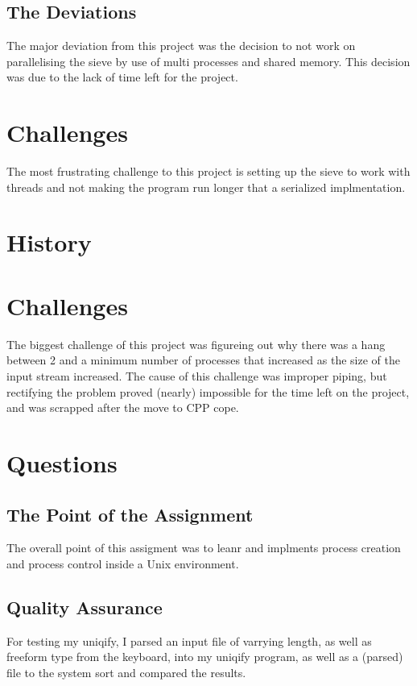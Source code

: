 \documentclass[letterpaper,10pt,titlepage]{article}
\begin{document}
\subsection{The Deviations}
\label{Deviations}
The major deviation from this project was the decision to not work on parallelising the sieve by use of multi processes and shared memory. This decision was due to the lack of time left for the project.
\section{Challenges}
\label{Intersting and Challenging Aspects} 
The most frustrating challenge to this project is setting up the sieve to work with threads and not making the program run longer that a serialized implmentation.
\section{History}
\label{primes Revision History}



\section{Challenges}
\label{Overcoming Project challenges}
The biggest challenge of this project was figureing out why there was a hang between 2 and a minimum number of processes that increased as the size of the input stream increased. The cause of this challenge was improper piping, but rectifying the problem proved (nearly) impossible for the time left on the project, and was scrapped after the move to CPP cope.

\section{Questions}
\label{Project Quesions}
\subsection{The Point of the Assignment}
\label{Point}
The overall point of this assigment was to leanr and implments process creation and process control inside a Unix environment.
\subsection{Quality Assurance}
\label{QA}
For testing my uniqify, I parsed an input file of varrying length, as well as freeform type from the keyboard, into my uniqify program, as well as a (parsed) file to the system sort and compared the results.
\end{document}
